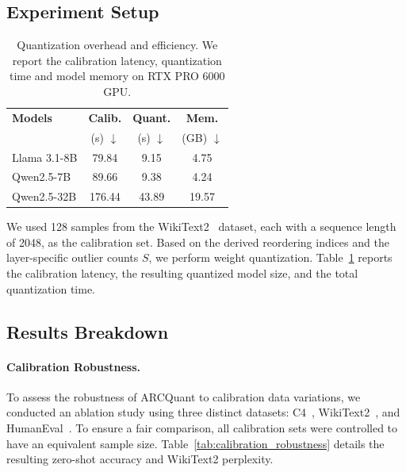 \documentclass[11pt]{article}
\begin{document}
\subsection{Experiment Setup}


\begin{table}[h]
\centering
\caption{Quantization overhead and efficiency. We report the calibration latency, quantization time and model memory on RTX PRO 6000 GPU.}
\label{tab:quant_efficiency}
\begin{tabular}{l|ccc}
\toprule
\textbf{Models} & \textbf{Calib.} & \textbf{Quant.} & \textbf{Mem.} \\
 & (s) $\downarrow$ & (s) $\downarrow$ & (GB) $\downarrow$ \\
\midrule
Llama 3.1-8B  & 79.84& 9.15  & 4.75  \\
Qwen2.5-7B    & 89.66& 9.38  & 4.24  \\
Qwen2.5-32B   & 176.44& 43.89 & 19.57 \\
\bottomrule
\end{tabular}
\end{table}

We used 128 samples from the WikiText2~\citep{wikitext} dataset, each with a sequence length of 2048, as the calibration set. 
Based on the derived reordering indices and the layer-specific outlier counts $S$, we perform weight quantization. 
Table~\ref{tab:quant_efficiency} reports the calibration latency, the resulting quantized model size, and the total quantization time.

\subsection{Results Breakdown}

\paragraph{Calibration Robustness.}
To assess the robustness of ARCQuant to calibration data variations, we conducted an ablation study using three distinct datasets: C4~\citep{c4}, WikiText2~\citep{wikitext}, and HumanEval~\citep{humaneval}. 
To ensure a fair comparison, all calibration sets were controlled to have an equivalent sample size. 
Table~\ref{tab:calibration_robustness} details the resulting zero-shot accuracy and WikiText2 perplexity.
\end{document}
